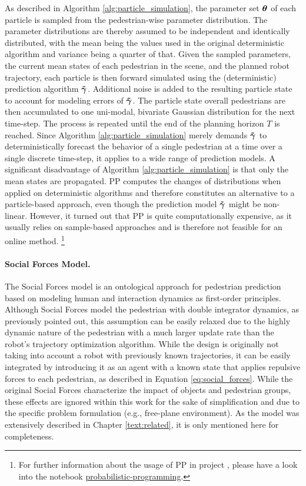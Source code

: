 As described in Algorithm \ref{alg:particle_simulation}, the parameter set $\pparam[]$ of each particle is sampled from the pedestrian-wise parameter distribution. The parameter distributions are thereby assumed to be independent and identically distributed, with the mean being the values used in the original deterministic algorithm and variance being a quarter of that. Given the sampled parameters, the current mean states of each pedestrian in the scene, and the planned robot trajectory, each particle is then forward simulated using the (deterministic) prediction algorithm $\distmodeldet[]$. Additional noise is added to the resulting particle state to account for modeling errors of $\distmodeldet[]$. The particle state overall pedestrians are then accumulated to one uni-modal, bivariate Gaussian distribution for the next time-step. The process is repeated until the end of the planning horizon $T$ is reached. Since Algorithm \ref{alg:particle_simulation} merely demands $\distmodeldet[]$ to deterministically forecast the behavior of a single pedestrian at a time over a single discrete time-step, it applies to a wide range of prediction models. 
\newline
A significant disadvantage of Algorithm \ref{alg:particle_simulation} is that only the mean states are propagated. \ac{PP} computes the changes of distributions when applied on deterministic algorithms and therefore constitutes an alternative to a particle-based approach, even though the prediction model $\distmodeldet[]$ might be non-linear. However, it turned out that \ac{PP} is quite computationally expensive, as it usually relies on sample-based approaches \cite{Jensen2007} and is therefore not feasible for an online method. \footnote{For further information about the usage of \ac{PP} in project \project, please have a look into the notebook \href{https://github.com/simon-schaefer/\project/blob/master/examples/misc/probabilistic_programming.ipynb}{probabilistic-programming}.}
 
\paragraph{Social Forces Model.} The Social Forces model is an ontological approach for pedestrian prediction based on modeling human and interaction dynamics as first-order principles. Although Social Forces model the pedestrian with double integrator dynamics, as previously pointed out, this assumption can be easily relaxed due to the highly dynamic nature of the pedestrian with a much larger update rate than the robot's trajectory optimization algorithm.  While the design is originally not taking into account a robot with previously known trajectories, it can be easily integrated by introducing it as an agent with a known state that applies repulsive forces to each pedestrian, as described in Equation \ref{eq:social_forces}. While the original Social Forces characterize the impact of objects and pedestrian groups, these effects are ignored within this work for the sake of simplification and due to the specific problem formulation (e.g., free-plane environment). As the model was extensively described in Chapter \ref{text:related}, it is only mentioned here for completeness. 

